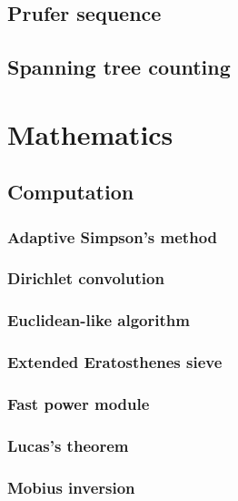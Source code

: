 \documentclass[titlepage,a4paper,10pt]{article}
\begin{document}
\begin{multicols}{2}
\begin{spacing}{0.8}
{				\subsection{Prufer sequence}
					
				\subsection{Spanning tree counting}
					
		\section{Mathematics}
			\subsection{Computation}
				\subsubsection{Adaptive Simpson's method}
					
				\subsubsection{Dirichlet convolution}
					
				\subsubsection{Euclidean-like algorithm}
					
				\subsubsection{Extended Eratosthenes sieve}
					
				\subsubsection{Fast power module}
					
				\subsubsection{Lucas's theorem}
					
				\subsubsection{Mobius inversion}
					
}
\end{spacing}
\end{multicols}
\end{document}
